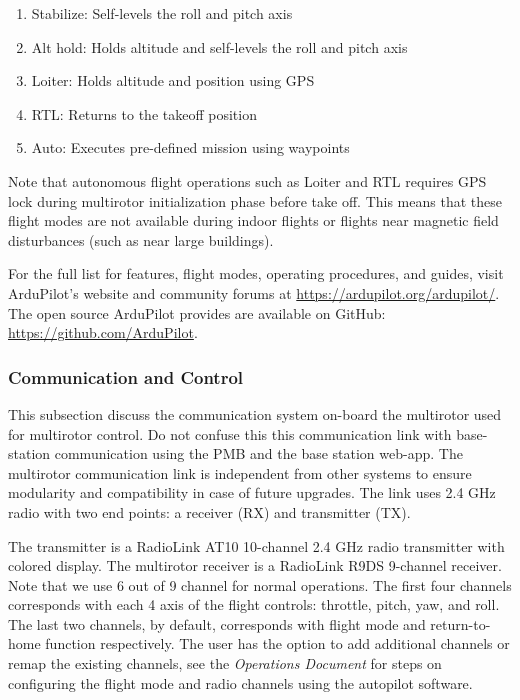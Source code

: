 \begin{enumerate}
	\item Stabilize: Self-levels the roll and pitch axis
	\item Alt hold: Holds altitude and self-levels the roll and pitch axis
	\item Loiter: Holds altitude and position using GPS
	\item RTL: Returns to the takeoff position
	\item Auto: Executes pre-defined mission using waypoints
\end{enumerate}

Note that autonomous flight operations such as Loiter and RTL requires GPS lock during multirotor initialization phase before take off. This means that these flight modes are not available during indoor flights or flights near magnetic field disturbances (such as near large buildings).

For the full list for features, flight modes, operating  procedures, and guides, visit ArduPilot's website and community forums at \url{https://ardupilot.org/ardupilot/}. The open source ArduPilot provides are available on GitHub: \url{https://github.com/ArduPilot}.

\subsubsection{Communication and Control}

This subsection discuss the communication system on-board the multirotor used for multirotor control. Do not confuse this this communication link with base-station communication using the PMB and the base station web-app.
The multirotor communication link is independent from other systems to ensure modularity and compatibility in case of future upgrades.
The link uses 2.4 GHz radio with two end points: a receiver (RX) and transmitter (TX).

The transmitter is a RadioLink AT10 10-channel 2.4 GHz radio transmitter with colored display\cite{at10}. The multirotor receiver is a RadioLink R9DS 9-channel receiver\cite{r9ds}. Note that we use 6 out of 9 channel for normal operations.
The first four channels corresponds with each 4 axis of the flight controls: throttle, pitch, yaw, and roll. The last two channels, by default, corresponds with flight mode and return-to-home function respectively. 
The user has the option to add additional channels or remap the existing channels, see the \textit{Operations Document} for steps on configuring the flight mode and radio channels using the autopilot software.

